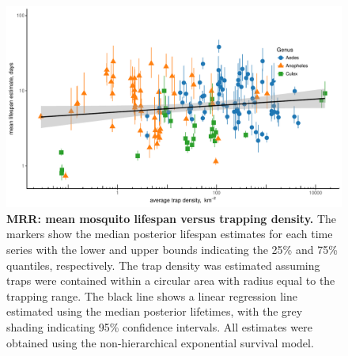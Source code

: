 \documentclass[12pt]{article}
\begin{document}
\begin{figure}[h]
	\centerline{\includegraphics[width=1\textwidth]{./Figure_files/mrr_lifespanVsTrapDensity.pdf}}
	\caption{\textbf{MRR: mean mosquito lifespan versus trapping density.} The markers show the median posterior lifespan estimates for each time series with the lower and upper bounds indicating the 25\% and 75\% quantiles, respectively. The trap density was estimated assuming traps were contained within a circular area with radius equal to the trapping range. The black line shows a linear regression line estimated using the median posterior lifetimes, with the grey shading indicating 95\% confidence intervals. All estimates were obtained using the non-hierarchical exponential survival model.}
	\label{fig:mrr_lifeSpanVsTrapDensity}
\end{figure}
\end{document}
